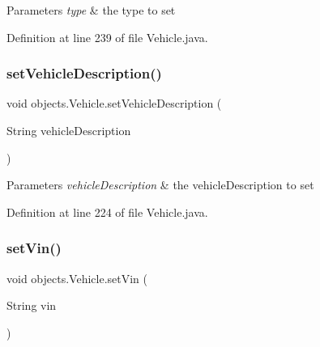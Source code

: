 \begin{DoxyParams}{Parameters}
{\em type} & the type to set \\
\hline
\end{DoxyParams}


Definition at line 239 of file Vehicle.\+java.


\begin{DoxyCode}{0}

\end{DoxyCode}
\mbox{\label{classobjects_1_1_vehicle_a1bccfae077033ebb25e11c592dfc81b4}} 
\subsubsection{\texorpdfstring{setVehicleDescription()}{setVehicleDescription()}}
{\footnotesize\ttfamily void objects.\+Vehicle.\+set\+Vehicle\+Description (\begin{DoxyParamCaption}\item[{String}]{vehicle\+Description }\end{DoxyParamCaption})}


\begin{DoxyParams}{Parameters}
{\em vehicle\+Description} & the vehicle\+Description to set \\
\hline
\end{DoxyParams}


Definition at line 224 of file Vehicle.\+java.


\begin{DoxyCode}{0}

\end{DoxyCode}
\mbox{\label{classobjects_1_1_vehicle_a44f61da3a4c308d475240e8a33889651}} 
\subsubsection{\texorpdfstring{setVin()}{setVin()}}
{\footnotesize\ttfamily void objects.\+Vehicle.\+set\+Vin (\begin{DoxyParamCaption}\item[{String}]{vin }\end{DoxyParamCaption})}


